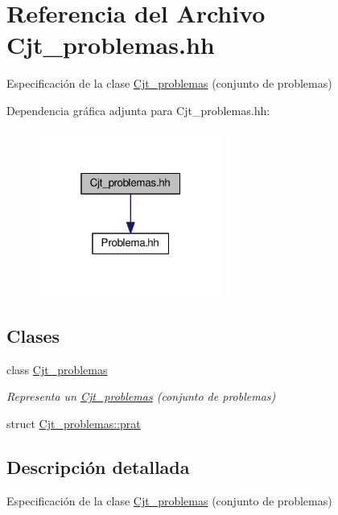 \hypertarget{_cjt__problemas_8hh}{}\section{Referencia del Archivo Cjt\+\_\+problemas.\+hh}
\label{_cjt__problemas_8hh}


Especificación de la clase \mbox{\hyperlink{class_cjt__problemas}{Cjt\+\_\+problemas}} (conjunto de problemas)  


Dependencia gráfica adjunta para Cjt\+\_\+problemas.\+hh\+:
\nopagebreak
\begin{figure}[H]
\begin{center}
\leavevmode
\includegraphics[width=172pt]{_cjt__problemas_8hh__incl}
\end{center}
\end{figure}
\subsection*{Clases}
\begin{DoxyCompactItemize}
\item 
class \mbox{\hyperlink{class_cjt__problemas}{Cjt\+\_\+problemas}}
\begin{DoxyCompactList}\small\item\em Representa un \mbox{\hyperlink{class_cjt__problemas}{Cjt\+\_\+problemas}} (conjunto de problemas) \end{DoxyCompactList}\item 
struct \mbox{\hyperlink{struct_cjt__problemas_1_1prat}{Cjt\+\_\+problemas\+::prat}}
\end{DoxyCompactItemize}


\subsection{Descripción detallada}
Especificación de la clase \mbox{\hyperlink{class_cjt__problemas}{Cjt\+\_\+problemas}} (conjunto de problemas) 


